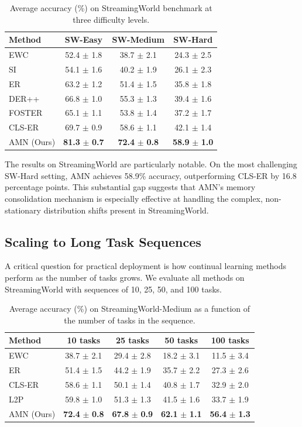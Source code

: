 \documentclass[11pt]{article}
\begin{document}
\begin{table}[h]
\centering
\caption{Average accuracy (\%) on StreamingWorld benchmark at three difficulty levels.}
\label{tab:streaming}
\begin{tabular}{lccc}
\hline
Method & SW-Easy & SW-Medium & SW-Hard \\
\hline
EWC & 52.4 $\pm$ 1.8 & 38.7 $\pm$ 2.1 & 24.3 $\pm$ 2.5 \\
SI & 54.1 $\pm$ 1.6 & 40.2 $\pm$ 1.9 & 26.1 $\pm$ 2.3 \\
ER & 63.2 $\pm$ 1.2 & 51.4 $\pm$ 1.5 & 35.8 $\pm$ 1.8 \\
DER++ & 66.8 $\pm$ 1.0 & 55.3 $\pm$ 1.3 & 39.4 $\pm$ 1.6 \\
FOSTER & 65.1 $\pm$ 1.1 & 53.8 $\pm$ 1.4 & 37.2 $\pm$ 1.7 \\
CLS-ER & 69.7 $\pm$ 0.9 & 58.6 $\pm$ 1.1 & 42.1 $\pm$ 1.4 \\
\hline
AMN (Ours) & \textbf{81.3} $\pm$ \textbf{0.7} & \textbf{72.4} $\pm$ \textbf{0.8} & \textbf{58.9} $\pm$ \textbf{1.0} \\
\hline
\end{tabular}
\end{table}

The results on StreamingWorld are particularly notable. On the most challenging SW-Hard setting, AMN achieves 58.9\% accuracy, outperforming CLS-ER by 16.8 percentage points. This substantial gap suggests that AMN's memory consolidation mechanism is especially effective at handling the complex, non-stationary distribution shifts present in StreamingWorld.

\subsection{Scaling to Long Task Sequences}

A critical question for practical deployment is how continual learning methods perform as the number of tasks grows. We evaluate all methods on StreamingWorld with sequences of 10, 25, 50, and 100 tasks.

\begin{table}[h]
\centering
\caption{Average accuracy (\%) on StreamingWorld-Medium as a function of the number of tasks in the sequence.}
\label{tab:scaling}
\begin{tabular}{@{}lcccc@{}}
\toprule
Method & 10 tasks & 25 tasks & 50 tasks & 100 tasks \\
\midrule
EWC & 38.7 $\pm$ 2.1 & 29.4 $\pm$ 2.8 & 18.2 $\pm$ 3.1 & 11.5 $\pm$ 3.4 \\
ER & 51.4 $\pm$ 1.5 & 44.2 $\pm$ 1.9 & 35.7 $\pm$ 2.2 & 27.3 $\pm$ 2.6 \\
CLS-ER & 58.6 $\pm$ 1.1 & 50.1 $\pm$ 1.4 & 40.8 $\pm$ 1.7 & 32.9 $\pm$ 2.0 \\
L2P & 59.8 $\pm$ 1.0 & 51.3 $\pm$ 1.3 & 41.5 $\pm$ 1.6 & 33.7 $\pm$ 1.9 \\
\midrule
AMN (Ours) & \textbf{72.4} $\pm$ \textbf{0.8} & \textbf{67.8} $\pm$ \textbf{0.9} & \textbf{62.1} $\pm$ \textbf{1.1} & \textbf{56.4} $\pm$ \textbf{1.3} \\
\bottomrule
\end{tabular}
\end{table}
\end{document}
